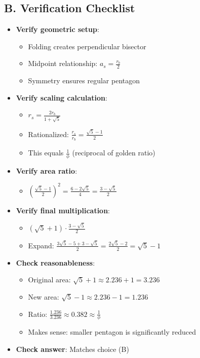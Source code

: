 \documentclass[12pt]{article}
\begin{document}
\begin{verificationbox}
\subsection*{B. Verification Checklist}
\begin{itemize}[leftmargin=*]
    \item \textbf{Verify geometric setup}:
    \begin{itemize}
        \item Folding creates perpendicular bisector \checkmark
        \item Midpoint relationship: $a_s = \frac{r_b}{2}$ \checkmark
        \item Symmetry ensures regular pentagon \checkmark
    \end{itemize}
    \item \textbf{Verify scaling calculation}:
    \begin{itemize}
        \item $r_s = \frac{2r_b}{1+\sqrt{5}}$ \checkmark
        \item Rationalized: $\frac{r_s}{r_b} = \frac{\sqrt{5}-1}{2}$ \checkmark
        \item This equals $\frac{1}{\phi}$ (reciprocal of golden ratio) \checkmark
    \end{itemize}
    \item \textbf{Verify area ratio}:
    \begin{itemize}
        \item $\left(\frac{\sqrt{5}-1}{2}\right)^2 = \frac{6-2\sqrt{5}}{4} = \frac{3-\sqrt{5}}{2}$ \checkmark
    \end{itemize}
    \item \textbf{Verify final multiplication}:
    \begin{itemize}
        \item $(\sqrt{5}+1) \cdot \frac{3-\sqrt{5}}{2}$
        \item Expand: $\frac{3\sqrt{5} - 5 + 3 - \sqrt{5}}{2} = \frac{2\sqrt{5}-2}{2} = \sqrt{5}-1$ \checkmark
    \end{itemize}
    \item \textbf{Check reasonableness}:
    \begin{itemize}
        \item Original area: $\sqrt{5}+1 \approx 2.236 + 1 = 3.236$
        \item New area: $\sqrt{5}-1 \approx 2.236 - 1 = 1.236$
        \item Ratio: $\frac{1.236}{3.236} \approx 0.382 \approx \frac{1}{\phi}$ \checkmark
        \item Makes sense: smaller pentagon is significantly reduced
    \end{itemize}
    \item \textbf{Check answer}: Matches choice (B) \checkmark
\end{itemize}


\end{verificationbox}
\end{document}
